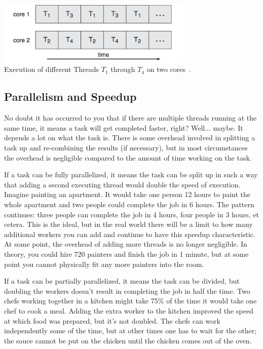 \begin{center}
	\includegraphics[width=0.7\textwidth]{images/dual-core-execution.png}\\
	Execution of different Threads $T_{1}$ through $T_{4}$ on two cores~\cite{osc}.
\end{center}

\subsection*{Parallelism and Speedup}

No doubt it has occurred to you that if there are multiple threads running at the same time, it means a task will get completed faster, right? Well... maybe. It depends a lot on what the task is. There is some overhead involved in splitting a task up and re-combining the results (if necessary), but in most circumstances the overhead is negligible compared to the amount of time working on the task.

If a task can be fully parallelized, it means the task can be split up in such a way that adding a second executing thread would double the speed of execution. Imagine painting an apartment. It would take one person 12 hours to paint the whole apartment and two people could complete the job in 6 hours. The pattern continues: three people can complete the job in 4 hours, four people in 3 hours, et cetera. This is the ideal, but in the real world there will be a limit to how many additional workers you can add and continue to have this speedup characteristic. At some point, the overhead of adding more threads is no longer negligible. In theory, you could hire 720 painters and finish the job in 1 minute, but at some point you cannot physically fit any more painters into the room.

If a task can be partially parallelized, it means the task can be divided, but doubling the workers doesn't result in completing the job in half the time. Two chefs working together in a kitchen might take 75\% of the time it would take one chef to cook a meal. Adding the extra worker to the kitchen improved the speed at which food was prepared, but it's not doubled. The chefs can work independently some of the time, but at other times one has to wait for the other; the sauce cannot be put on the chicken until the chicken comes out of the oven.

